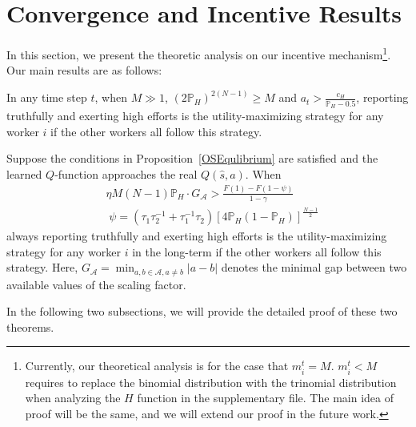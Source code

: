 \section{Convergence and Incentive Results}
\label{analysis}
In this section, we present the theoretic analysis on our incentive mechanism\footnote{Currently, our theoretical analysis is for the case that $m_i^t=M$. $m_i^t<M$ requires to replace the binomial distribution with the trinomial distribution when analyzing the $H$ function in the supplementary file. The main idea of proof will be the same, and we will extend our proof in the future work.}. Our main results are as follows:
\begin{theorem}
\label{OSEqulibrium}
In any time step $t$, when $M\gg 1$, $(2\mathbb{P}_H)^{2(N-1)} \geq M$ and $a_t>\frac{c_H}{\mathbb{P}_H-0.5}$, reporting truthfully and exerting high efforts is the utility-maximizing strategy for any worker $i$ if the other workers all follow this strategy.
\end{theorem}
\begin{theorem}
\label{RMNE}
Suppose the conditions in Proposition~\ref{OSEqulibrium} are satisfied and the learned $Q$-function approaches the real $Q(\hat{s},a)$. When
\begin{align}
&\eta M(N-1)\mathbb{P}_H \cdot G_{\mathcal{A}}> \frac{F(1)-F(1-\psi)}{1-\gamma}\label{Condition}\\
&\;\psi =(\tau_1\tau_2^{-1}+\tau_1^{-1}\tau_2)[4\mathbb{P}_H(1-\mathbb{P}_H)]^{\frac{N-1}{2}} \label{equation:psi}
\end{align}
always reporting truthfully and exerting high efforts is the utility-maximizing strategy for any worker $i$ in the long-term if the other workers all follow this strategy. Here, $G_{\mathcal{A}}=\min_{a,b\in\mathcal{A}, a\neq b}|a-b|$ denotes the minimal gap between two available values of the scaling factor.
\end{theorem}
In the following two subsections, we will provide the detailed proof of these two theorems. 
%
